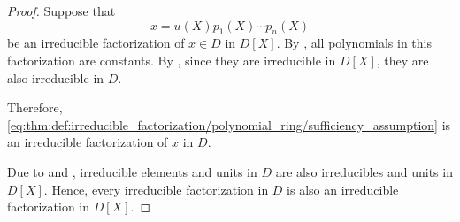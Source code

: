 \begin{proof}

  \SufficiencySubProof* Suppose that
  \begin{equation}\label{eq:thm:def:irreducible_factorization/polynomial_ring/sufficiency_assumption}
    x = u(X) p_1(X) \cdots p_n(X)
  \end{equation}
  be an irreducible factorization of \( x \in D \) in \( D[X] \). By , all polynomials in this factorization are constants. By , since they are irreducible in \( D[X] \), they are also irreducible in \( D \).

  Therefore, \eqref{eq:thm:def:irreducible_factorization/polynomial_ring/sufficiency_assumption} is an irreducible factorization of \( x \) in \( D \).

  \NecessitySubProof* Due to  and , irreducible elements and units in \( D \) are also irreducibles and units in \( D[X] \). Hence, every irreducible factorization in \( D \) is also an irreducible factorization in \( D[X] \).
\end{proof}

